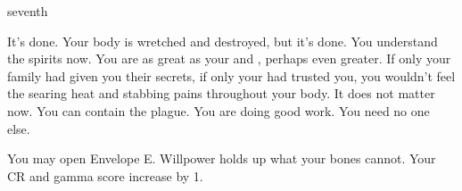 \documentclass[greennotebook]{Pestilence} %
\begin{document}
\begin{page}{seventh}

It's done. Your body is wretched and destroyed, but it's done. You understand the spirits now. You are as great as your \cElder{\parent} and \cRebel{\sibling}, perhaps even greater. If only your family had given you their secrets, if only your \cElder{\parent} had trusted you, you wouldn't feel the searing heat and stabbing pains throughout your body. It does not matter now. You can contain the plague. You are doing good work. You need no one else. 

You may open Envelope E. Willpower holds up what your bones cannot. Your CR and gamma score increase by 1.

\end{page}

\endnotebook
\end{document}
